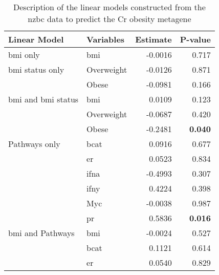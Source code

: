 \begin{table}[htpb]
	\centering
	\caption{Description of the linear models constructed from the \gls{nzbc} data to predict the Cr obesity metagene}
	\label{tab:lm_sig_var}
	\begin{threeparttable}
		\begin{tabular}{llrr}
			Linear Model & Variables & Estimate & P-value\\
			\hline
			\hline
			\rule{0pt}{2.25ex}\gls{bmi} only                           & \gls{bmi}  & -0.0016 & 0.717\\
			\hline
			\rule{0pt}{2.25ex}\gls{bmi} status only                    & Overweight & -0.0126 & 0.871\\
                                                                       & Obese      & -0.0981 & 0.166\\
			\hline
			\rule{0pt}{2.25ex}\gls{bmi} and \gls{bmi} status           & \gls{bmi}  & 0.0109  & 0.123\\
                                                                       & Overweight & -0.0687 & 0.420\\
                                                                       & Obese      & -0.2481 & \textbf{0.040}\tnote{1}\\
			\hline
			\rule{0pt}{2.25ex}Pathways only                            & \gls{bcat} & 0.0916  & 0.677\\
                                                                       & \gls{er}   & 0.0523  & 0.834\\
                                                                       & \gls{ifna} & -0.4993 & 0.307\\
                                                                       & \gls{ifny} & 0.4224  & 0.398\\
                                                                       & Myc        & -0.0038 & 0.987\\
                                                                       & \gls{pr}   & 0.5836  & \textbf{0.016}\\
			\hline
			\rule{0pt}{2.25ex}\gls{bmi} and Pathways                   & \gls{bmi}  & -0.0024 & 0.527\\
                                                                       & \gls{bcat} & 0.1121  & 0.614\\
                                                                       & \gls{er}   & 0.0540  & 0.829\\

\end{tabular}
\end{threeparttable}
\end{table}

